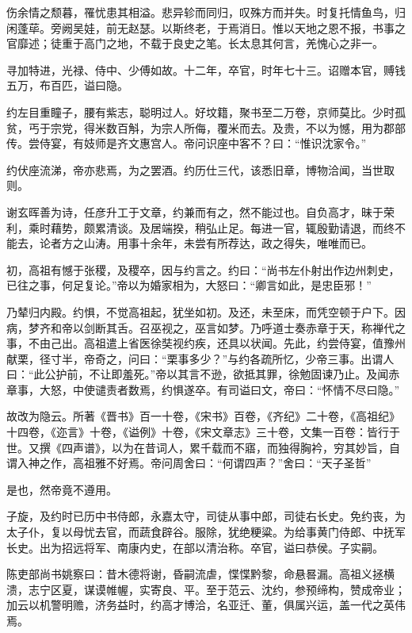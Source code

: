 \documentclass[12pt,UTF8]{ctexbook}
\begin{document}
伤余情之颓暮，罹忧患其相溢。悲异轸而同归，叹殊方而并失。时复托情鱼鸟，归闲蓬荜。旁阙吴娃，前无赵瑟。以斯终老，于焉消日。惟以天地之恩不报，书事之官靡述；徒重于高门之地，不载于良史之笔。长太息其何言，羌愧心之非一。

寻加特进，光禄、侍中、少傅如故。十二年，卒官，时年七十三。诏赠本官，赙钱五万，布百匹，谥曰隐。

约左目重瞳子，腰有紫志，聪明过人。好坟籍，聚书至二万卷，京师莫比。少时孤贫，丐于宗党，得米数百斛，为宗人所侮，覆米而去。及贵，不以为憾，用为郡部传。尝侍宴，有妓师是齐文惠宫人。帝问识座中客不？曰：“惟识沈家令。”

约伏座流涕，帝亦悲焉，为之罢酒。约历仕三代，该悉旧章，博物洽闻，当世取则。

谢玄晖善为诗，任彦升工于文章，约兼而有之，然不能过也。自负高才，昧于荣利，乘时藉势，颇累清谈。及居端揆，稍弘止足。每进一官，辄殷勤请退，而终不能去，论者方之山涛。用事十余年，未尝有所荐达，政之得失，唯唯而已。

初，高祖有憾于张稷，及稷卒，因与约言之。约曰：“尚书左仆射出作边州刺史，已往之事，何足复论。”帝以为婚家相为，大怒曰：“卿言如此，是忠臣邪！”

乃辇归内殿。约惧，不觉高祖起，犹坐如初。及还，未至床，而凭空顿于户下。因病，梦齐和帝以剑断其舌。召巫视之，巫言如梦。乃呼道士奏赤章于天，称禅代之事，不由己出。高祖遣上省医徐奘视约疾，还具以状闻。先此，约尝侍宴，值豫州献栗，径寸半，帝奇之，问曰：“栗事多少？”与约各疏所忆，少帝三事。出谓人曰：“此公护前，不让即羞死。”帝以其言不逊，欲抵其罪，徐勉固谏乃止。及闻赤章事，大怒，中使谴责者数焉，约惧遂卒。有司谥曰文，帝曰：“怀情不尽曰隐。”

故改为隐云。所著《晋书》百一十卷，《宋书》百卷，《齐纪》二十卷，《高祖纪》十四卷，《迩言》十卷，《谥例》十卷，《宋文章志》三十卷，文集一百卷：皆行于世。又撰《四声谱》，以为在昔词人，累千载而不寤，而独得胸衿，穷其妙旨，自谓入神之作，高祖雅不好焉。帝问周舍曰：“何谓四声？”舍曰：“天子圣哲”

是也，然帝竟不遵用。

子旋，及约时已历中书侍郎，永嘉太守，司徒从事中郎，司徒右长史。免约丧，为太子仆，复以母忧去官，而蔬食辟谷。服除，犹绝粳粱。为给事黄门侍郎、中抚军长史。出为招远将军、南康内史，在部以清治称。卒官，谥曰恭侯。子实嗣。

陈吏部尚书姚察曰：昔木德将谢，昏嗣流虐，惵惵黔黎，命悬晷漏。高祖义拯横溃，志宁区夏，谋谟帷幄，实寄良、平。至于范云、沈约，参预缔构，赞成帝业；加云以机警明赡，济务益时，约高才博洽，名亚迁、董，俱属兴运，盖一代之英伟焉。
\end{document}
